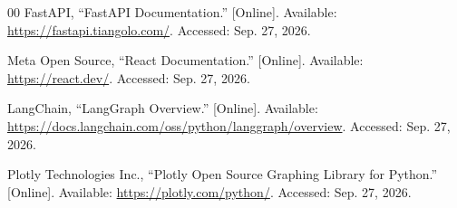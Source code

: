 \documentclass[conference]{IEEEtran}
\begin{document}
\begin{thebibliography}{00}
FastAPI, ``FastAPI Documentation.'' [Online]. Available: \url{https://fastapi.tiangolo.com/}. Accessed: Sep. 27, 2026.

Meta Open Source, ``React Documentation.'' [Online]. Available: \url{https://react.dev/}. Accessed: Sep. 27, 2026.

LangChain, ``LangGraph Overview.'' [Online]. Available: \url{https://docs.langchain.com/oss/python/langgraph/overview}. Accessed: Sep. 27, 2026.

Plotly Technologies Inc., ``Plotly Open Source Graphing Library for Python.'' [Online]. Available: \url{https://plotly.com/python/}. Accessed: Sep. 27, 2026.
\end{thebibliography}
\end{document}
